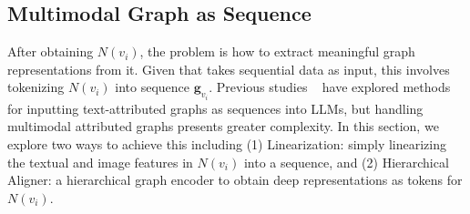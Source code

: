 
\subsection{Multimodal Graph as Sequence}\label{sec:graph-tokenization}

After obtaining $N(v_i)$, the problem is how to extract meaningful graph representations from it. 
Given that \Ours takes sequential data as input, this involves tokenizing $N(v_i)$ into sequence $\bm{g}_{v_i}$. Previous studies ~\cite{zhu2024investigating, Liu2024graphprompter,instructglm} have explored methods for inputting text-attributed graphs as sequences into LLMs, but handling multimodal attributed graphs presents greater complexity.
In this section, we explore two ways to achieve this including (1) Linearization: simply linearizing the textual and image features in $N(v_i)$ into a sequence, and (2) Hierarchical Aligner: a hierarchical graph encoder to obtain deep representations as tokens for $N(v_i)$.

